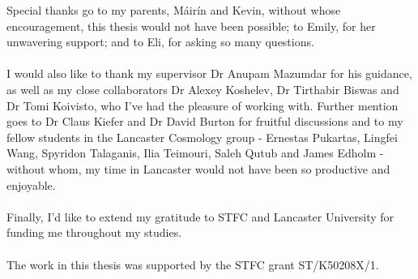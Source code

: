 

\begin{acknowledgements}      %
Special thanks go to my parents, M\'{a}ir\'{i}n and Kevin, without whose encouragement, this thesis would not have been possible; to Emily, for her unwavering support; and to Eli, for asking so many questions.
\\\\
I would also like to thank my supervisor Dr Anupam Mazumdar for his guidance, as well as my close collaborators Dr Alexey Koshelev, Dr Tirthabir Biswas and Dr Tomi Koivisto, who I've had the pleasure of working with. Further mention goes to Dr Claus Kiefer and Dr David Burton for fruitful discussions and to my fellow students in the Lancaster Cosmology group - Ernestas Pukartas, Lingfei Wang, Spyridon Talaganis, Ilia Teimouri, Saleh Qutub and James Edholm - without whom, my time in Lancaster would not have been so productive and enjoyable. 
\\\\
Finally, I'd like to extend my gratitude to STFC and Lancaster University for funding me throughout my studies.  
\\\\
The work in this thesis was supported by the STFC grant ST/K50208X/1.

\end{acknowledgements}



